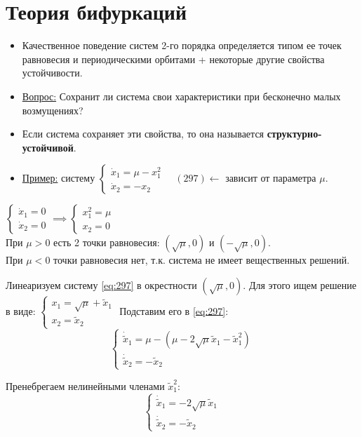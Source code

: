 \section{Теория бифуркаций}
\begin{itemize}
	\item Качественное поведение систем 2-го порядка определяется типом ее точек равновесия и периодическими орбитами + некоторые другие свойства устойчивости.
	\item \underline{Вопрос:} Сохранит ли система свои характеристики при бесконечно малых возмущениях?
	\item Если система сохраняет эти свойства, то она называется \textbf{структурно-устойчивой}.
	\item \underline{Пример:} систему $\begin{cases} \dot{x}_1 = \mu - x_1^2 \\ \dot{x}_2 = -x_2 \end{cases} \quad (297) \label{eq:297} \leftarrow$ зависит от параметра $\mu$.
\end{itemize}

$\begin{cases} \dot{x}_1 = 0 \\ \dot{x}_2 = 0 \end{cases} \implies \begin{cases} x_1^2 = \mu \\ x_2 = 0 \end{cases}$ \\
При $\mu > 0$ есть 2 точки равновесия: $(\sqrt{\mu}, 0)$ и $(-\sqrt{\mu}, 0)$. \\
При $\mu < 0$ точки равновесия нет, т.к. система не имеет вещественных решений.

Линеаризуем систему \eqref{eq:297} в окрестности $(\sqrt{\mu}, 0)$.
Для этого ищем решение в виде: $\begin{cases} x_1 = \sqrt{\mu} + \tilde{x}_1 \\ x_2 = \tilde{x}_2 \end{cases}$
Подставим его в \eqref{eq:297}:
$$\begin{cases} \dot{\tilde{x}}_1 = \mu - (\mu - 2\sqrt{\mu}\tilde{x}_1 - \tilde{x}_1^2) \\ \dot{\tilde{x}}_2 = -\tilde{x}_2 \end{cases}$$

Пренебрегаем нелинейными членами $\tilde{x}_1^2$:
$$\begin{cases} \dot{\tilde{x}}_1 = -2\sqrt{\mu}\tilde{x}_1 \\ \dot{\tilde{x}}_2 = -\tilde{x}_2 \end{cases}$$

